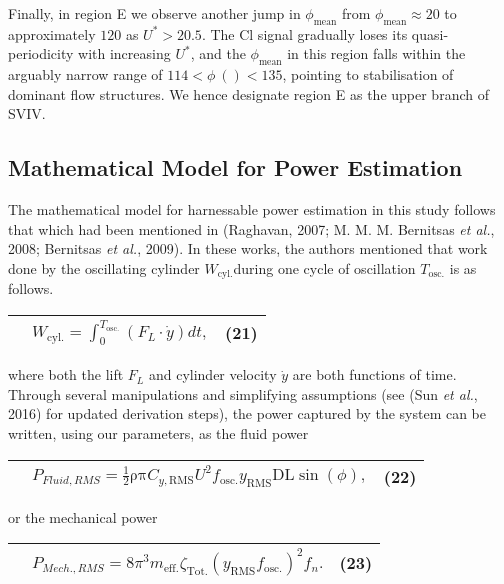\documentclass[]{article}
\begin{document}
Finally, in region E we observe another jump in \(\phi_{\text{mean}}\)
from \(\phi_{\text{mean}} \approx 20\) to approximately \(120\) as
\(U^{*} > 20.5\). The Cl signal gradually loses its quasi-periodicity
with increasing \(U^{*}\), and the \(\phi_{\text{mean}}\) in this region
falls within the arguably narrow range of
\(114 < \phi\ \left( \right) < 135\), pointing to stabilisation of
dominant flow structures. We hence designate region E as the upper
branch of SVIV.

\hypertarget{mathematical-model-for-power-estimation}{\subsection{Mathematical
Model for Power
Estimation}\label{mathematical-model-for-power-estimation}}

The mathematical model for harnessable power estimation in this study
follows that which had been mentioned in (Raghavan, 2007; M. M. M.
Bernitsas \emph{et al.}, 2008; Bernitsas \emph{et al.}, 2009). In these
works, the authors mentioned that work done by the oscillating cylinder
\(W_{\text{cyl.}}\)during one cycle of oscillation \(T_{\text{osc.}}\)
is as follows.

\begin{longtable}[]{@{}lll@{}}
\toprule
&
\(W_{\text{cyl.}} = \int_{0}^{T_{\text{osc.}}}\left( F_{L} \cdot \dot{y} \right)dt,\)
& (21)\tabularnewline
\midrule
\endhead
\bottomrule
\end{longtable}

where both the lift \(F_{L}\) and cylinder velocity \(\dot{y}\) are both
functions of time. Through several manipulations and simplifying
assumptions (see (Sun \emph{et al.}, 2016) for updated derivation
steps), the power captured by the system can be written, using our
parameters, as the fluid power

\begin{longtable}[]{@{}lll@{}}
\toprule
&
\(P_{Fluid,RMS} = \frac{1}{2}\text{ρπ}C_{y,\text{RMS}}U^{2}f_{\text{osc.}}y_{\text{RMS}}\text{DL}\sin\left( \phi \right),\)
& \protect\hypertarget{_Ref41049025}{}{}(22)\tabularnewline
\midrule
\endhead
\bottomrule
\end{longtable}

or the mechanical power

\begin{longtable}[]{@{}lll@{}}
\toprule
&
\(P_{Mech.,RMS} = 8\pi^{3}m_{\text{eff.}}\zeta_{\text{Tot.}}\left( y_{\text{RMS}}f_{\text{osc.}} \right)^{2}f_{n}.\)
& \protect\hypertarget{_Ref41049030}{}{}(23)\tabularnewline
\midrule
\endhead
\bottomrule
\end{longtable}
\end{document}
